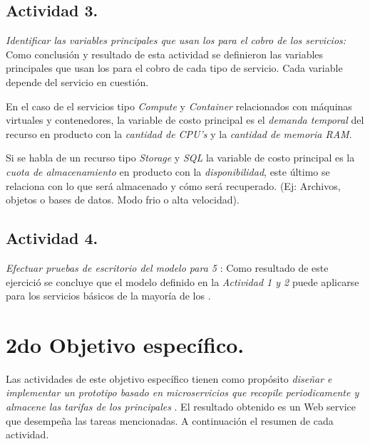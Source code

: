 \subsection{Actividad 3.}
\emph{Identificar las variables principales que usan los  para el cobro de los servicios:}
\newline\newline
Como conclusión y resultado de esta actividad se definieron las variables principales que usan los  para el cobro de cada tipo de servicio. Cada variable depende del servicio en cuestión.
\newline

En el caso de el servicios tipo \emph{Compute} y \emph{Container} relacionados con máquinas virtuales y contenedores, la variable de costo principal es el \emph{demanda temporal} del recurso en producto con la \emph{cantidad de CPU's} y la \emph{cantidad de memoria RAM}.
\newline

Si se habla de un recurso tipo \emph{Storage} y \emph{SQL} la variable de costo principal es la \emph{cuota de almacenamiento} en producto con la \emph{disponibilidad}, este último se relaciona con lo que será almacenado y cómo será recuperado. (Ej: Archivos, objetos o bases de datos. Modo frio o alta velocidad).
\newline

\subsection{Actividad 4.}
\emph{Efectuar pruebas de escritorio del modelo para 5 }:
\newline\newline
Como resultado de este ejercició se concluye que el modelo definido en la \emph{Actividad 1 y 2} puede aplicarse para los servicios básicos de la mayoría de los .

\section{2do Objetivo específico.}
Las actividades de este objetivo específico tienen como propósito \emph{diseñar e implementar un prototipo basado en microservicios que recopile periodicamente y almacene las tarifas de los principales }. El resultado obtenido es un Web service que desempeña las tareas mencionadas. A continuación el resumen de cada actividad.

